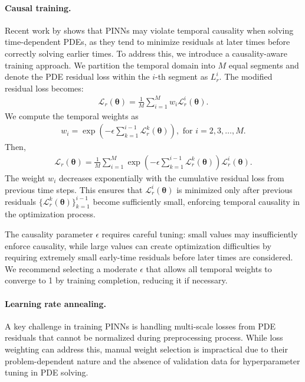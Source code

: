 \paragraph{Causal training.}
Recent work by \cite{wang2022respecting} shows that PINNs may violate temporal causality when solving time-dependent PDEs, as they tend to minimize residuals at later times before correctly solving earlier times. To address this, we introduce a causality-aware training approach.
We partition the temporal domain into $M$ equal segments and denote the PDE residual loss within the $i$-th segment as $L_r^i$. The modified residual loss becomes:
\begin{align}
       \mathcal{L}_r(\mathbf{\theta}) = \frac{1}{M} \sum_{i=1}^M w_i \mathcal{L}_r^i(\mathbf{\theta}).
\end{align}
We compute the temporal weights as
\begin{align}
      \label{eq: temporal_update}
    w_i = \exp\left(- \epsilon \sum_{k=1}^{i-1}  \mathcal{L}_r^k( \mathbf{\theta})\right)    , \text{ for } i = 2, 3, \dots, M.
  \end{align}
Then,
\begin{align}
     \mathcal{L}_r(\mathbf{\theta}) = \frac{1}{M} \sum_{i=1}^M     \exp\left(- \epsilon \sum_{k=1}^{i-1}  \mathcal{L}_r^k( \mathbf{\theta})\right) \mathcal L_r^i(\mathbf{\theta}).
\end{align}
The weight $w_i$ decreases exponentially with the cumulative residual loss from previous time steps. This ensures that $\mathcal{L}_r^i(\mathbf{\theta})$ is minimized only after previous residuals $\{\mathcal{L}_r^k(\mathbf{\theta})\}_{k=1}^{i-1}$ become sufficiently small, enforcing temporal causality in the optimization process.

The causality parameter $\epsilon$ requires careful tuning: small values may insufficiently enforce causality, while large values can create optimization difficulties by requiring extremely small early-time residuals before later times are considered. We recommend selecting a moderate $\epsilon$ that allows all temporal weights to converge to 1 by training completion, reducing it if necessary.




\paragraph{Learning rate annealing.} 

A key challenge in training PINNs is handling multi-scale losses from PDE residuals that cannot be normalized during preprocessing process. While loss weighting can address this, manual weight selection is impractical due to their problem-dependent nature and the absence of validation data for hyperparameter tuning in PDE solving.


